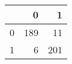 \begin{tabular}{lrr}
\toprule
{} &    0 &    1 \\
\midrule
0 &  189 &   11 \\
1 &    6 &  201 \\
\bottomrule
\end{tabular}
